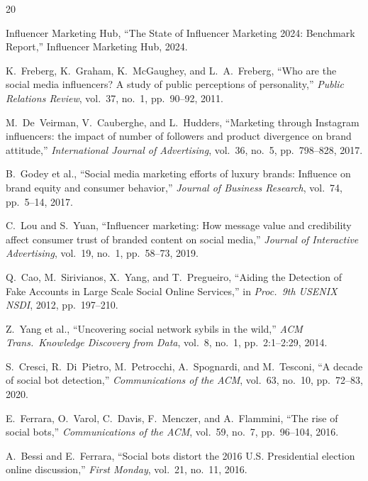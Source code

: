 \documentclass[conference]{IEEEtran}
\begin{document}

\begin{thebibliography}{20}

Influencer Marketing Hub,
``The State of Influencer Marketing 2024: Benchmark Report,''
Influencer Marketing Hub, 2024.

K.~Freberg, K.~Graham, K.~McGaughey, and L.~A.~Freberg,
``Who are the social media influencers? A study of public perceptions of personality,''
\emph{Public Relations Review}, vol.~37, no.~1, pp.~90--92, 2011.

M.~De~Veirman, V.~Cauberghe, and L.~Hudders,
``Marketing through Instagram influencers: the impact of number of followers
and product divergence on brand attitude,''
\emph{International Journal of Advertising}, vol.~36, no.~5, pp.~798--828, 2017.

B.~Godey et al.,
``Social media marketing efforts of luxury brands: Influence on brand equity
and consumer behavior,''
\emph{Journal of Business Research}, vol.~74, pp.~5--14, 2017.

C.~Lou and S.~Yuan,
``Influencer marketing: How message value and credibility affect consumer
trust of branded content on social media,''
\emph{Journal of Interactive Advertising}, vol.~19, no.~1, pp.~58--73, 2019.

Q.~Cao, M.~Sirivianos, X.~Yang, and T.~Pregueiro,
``Aiding the Detection of Fake Accounts in Large Scale Social Online Services,''
in \emph{Proc.\ 9th USENIX NSDI}, 2012, pp.~197--210.

Z.~Yang et al.,
``Uncovering social network sybils in the wild,''
\emph{ACM Trans.\ Knowledge Discovery from Data}, vol.~8, no.~1, pp.~2:1--2:29, 2014.

S.~Cresci, R.~Di~Pietro, M.~Petrocchi, A.~Spognardi, and M.~Tesconi,
``A decade of social bot detection,''
\emph{Communications of the ACM}, vol.~63, no.~10, pp.~72--83, 2020.

E.~Ferrara, O.~Varol, C.~Davis, F.~Menczer, and A.~Flammini,
``The rise of social bots,''
\emph{Communications of the ACM}, vol.~59, no.~7, pp.~96--104, 2016.

A.~Bessi and E.~Ferrara,
``Social bots distort the 2016 U.S. Presidential election online discussion,''
\emph{First Monday}, vol.~21, no.~11, 2016.


\end{thebibliography}
\end{document}
